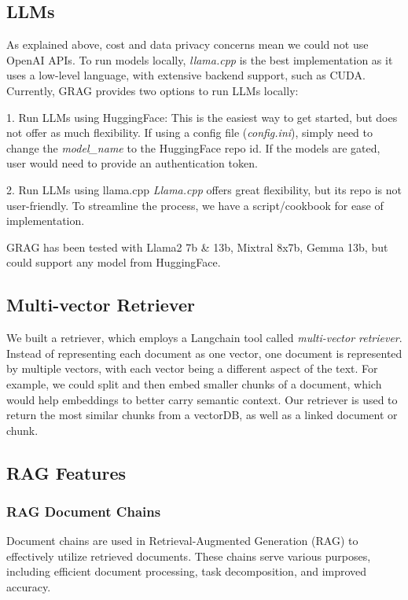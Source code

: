 \documentclass{scrartcl}
\begin{document}
\subsection{LLMs}
As explained above, cost and data privacy concerns mean we could not use OpenAI APIs. To run models locally, \textit{llama.cpp} is the best implementation as it uses a low-level language, with extensive backend support, such as CUDA.
Currently, GRAG provides two options to run LLMs locally:

1. Run LLMs using HuggingFace:
This is the easiest way to get started, but does not offer as much flexibility. If using a config file (\textit{config.ini}), simply need to change the \textit{model_name} to the HuggingFace repo id.
If the models are gated, user would need to provide an authentication token.

2. Run LLMs using llama.cpp
\textit{Llama.cpp} offers great flexibility, but its repo is not user-friendly. To streamline the process, we have a script/cookbook for ease of implementation.

GRAG has been tested with Llama2 7b & 13b, Mixtral 8x7b, Gemma 13b, but could support any model from HuggingFace.

\subsection{Multi-vector Retriever}

We built a retriever, which employs a Langchain tool called \textit{multi-vector retriever}.
Instead of representing each document as one vector, one document is represented by multiple vectors, with each vector being a different aspect of the text.
For example, we could split and then embed smaller chunks of a document, which would help embeddings to better carry semantic context.
Our retriever is used to return the most similar chunks from a vectorDB, as well as a linked document or chunk.

\subsection{RAG Features}

\subsubsection{RAG Document Chains}

Document chains are used in Retrieval-Augmented Generation (RAG) to effectively utilize retrieved documents. These chains serve various purposes, including efficient document processing, task decomposition, and improved accuracy.
\end{document}
